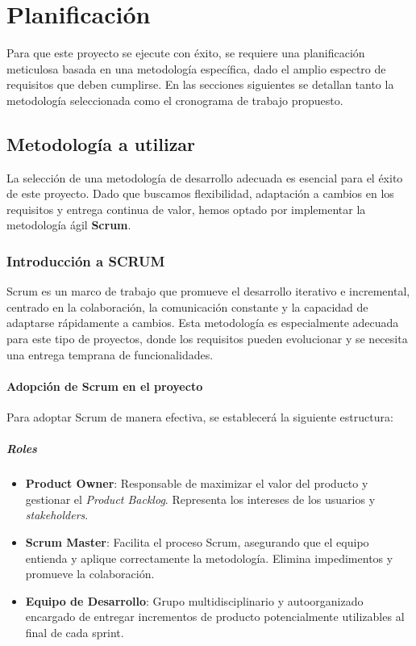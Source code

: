 \chapter{Planificación}

Para que este proyecto se ejecute con éxito, se requiere una planificación meticulosa basada en una metodología específica, dado el amplio espectro de requisitos que deben cumplirse. En las secciones siguientes se detallan tanto la metodología seleccionada como el cronograma de trabajo propuesto.

\section{Metodología a utilizar}
La selección de una metodología de desarrollo adecuada es esencial para el éxito de este proyecto. Dado que buscamos flexibilidad, adaptación a cambios en los requisitos y entrega continua de valor, hemos optado por implementar la metodología ágil \textbf{Scrum}.

\subsection{Introducción a SCRUM}

Scrum es un marco de trabajo que promueve el desarrollo iterativo e incremental, centrado en la colaboración, la comunicación constante y la capacidad de adaptarse rápidamente a cambios. Esta metodología es especialmente adecuada para este tipo de proyectos, donde los requisitos pueden evolucionar y se necesita una entrega temprana de funcionalidades.

\subsubsection{Adopción de Scrum en el proyecto}

Para adoptar Scrum de manera efectiva, se establecerá la siguiente estructura:

\paragraph{Roles}

\begin{itemize} 
	\item \textbf{Product Owner}: Responsable de maximizar el valor del producto y gestionar el \textit{Product Backlog}. Representa los intereses de los usuarios y \textit{stakeholders}. 
	\item \textbf{Scrum Master}: Facilita el proceso Scrum, asegurando que el equipo entienda y aplique correctamente la metodología. Elimina impedimentos y promueve la colaboración. 
	\item \textbf{Equipo de Desarrollo}: Grupo multidisciplinario y autoorganizado encargado de entregar incrementos de producto potencialmente utilizables al final de cada sprint. 
\end{itemize}

